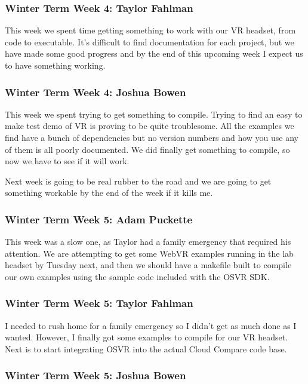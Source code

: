 \documentclass[draftclsnofoot,onecolumn]{IEEEtran}
\begin{document}
\subsubsection{Winter Term Week 4: Taylor Fahlman}

This week we spent time getting something to work with our VR headset, from code to executable. It's difficult to find documentation for each project, but we have made some good progress and by the end of this upcoming week I expect us to have something working.

\subsubsection{Winter Term Week 4: Joshua Bowen}

This week we spent trying to get something to compile. Trying to find an easy to make test demo of VR is proving to be quite troublesome. All the examples we find have a bunch of dependencies but no version numbers and how you use any of them is all poorly documented. We did finally get something to compile, so now we have to see if it will work.

Next week is going to be real rubber to the road and we are going to get something workable by the end of the week if it kills me.

\subsubsection{Winter Term Week 5: Adam Puckette}

This week was a slow one, as Taylor had a family emergency that required his attention. We are attempting to get some WebVR examples running in the lab headset by Tuesday next, and then we should have a makefile built to compile our own examples using the sample code included with the OSVR SDK.

\subsubsection{Winter Term Week 5: Taylor Fahlman}

I needed to rush home for a family emergency so I didn't get as much done as I wanted. However, I finally got some examples to compile for our VR headset. Next is to start integrating OSVR into the actual Cloud Compare code base.

\subsubsection{Winter Term Week 5: Joshua Bowen}
\end{document}
